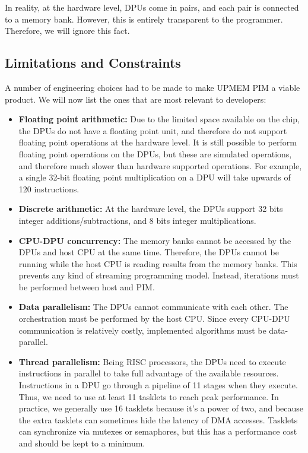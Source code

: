 In reality, at the hardware level, DPUs come in pairs, and each pair is connected to a memory bank. However, this is entirely transparent to the programmer. Therefore, we will ignore this fact.

\subsection{Limitations and Constraints}
\label{subsection:Limitations}

A number of engineering choices had to be made to make UPMEM PIM a viable product. We will now list the ones that are most relevant to developers:

\begin{itemize}
    \item \textbf{Floating point arithmetic:} Due to the limited space available on the chip, the DPUs do not have a floating point unit, and therefore do not support floating point operations at the hardware level. It is still possible to perform floating point operations on the DPUs, but these are simulated operations, and therefore much slower than hardware supported operations. For example, a single 32-bit floating point multiplication on a DPU will take upwards of 120 instructions.
    \item \textbf{Discrete arithmetic:} At the hardware level, the DPUs support 32 bits integer additions/subtractions, and 8 bits integer multiplications.
    \item \textbf{CPU-DPU concurrency:} The memory banks cannot be accessed by the DPUs and host CPU at the same time. Therefore, the DPUs cannot be running while the host CPU is reading results from the memory banks. This prevents any kind of streaming programming model. Instead, iterations must be performed between host and PIM.
    \item \textbf{Data parallelism:} The DPUs cannot communicate with each other. The orchestration must be performed by the host CPU. Since every CPU-DPU communication is relatively costly, implemented algorithms must be data-parallel.
    \item \textbf{Thread parallelism:} Being RISC processors, the DPUs need to execute instructions in parallel to take full advantage of the available resources. Instructions in a DPU go through a pipeline of 11 stages when they execute. Thus, we need to use at least 11 tasklets to reach peak performance. In practice, we generally use 16 tasklets because it's a power of two, and because the extra tasklets can sometimes hide the latency of DMA accesses. Tasklets can synchronize via mutexes or semaphores, but this has a performance cost and should be kept to a minimum.

\end{itemize}
